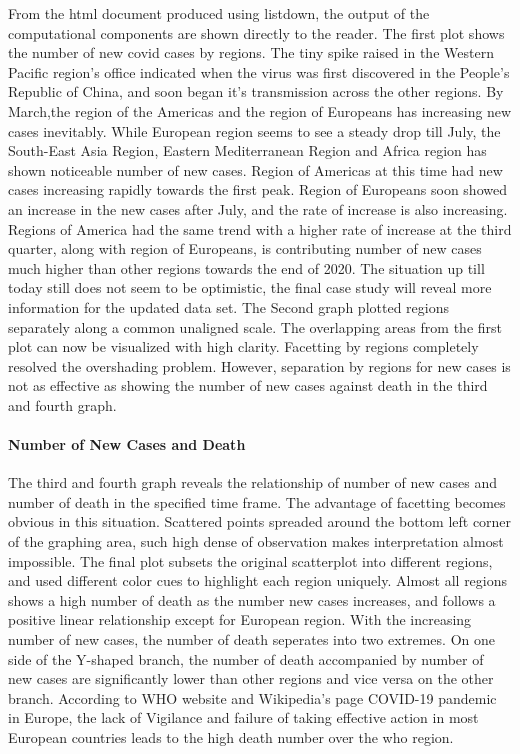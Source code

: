 \documentclass[
]{article}
\begin{document}
From the html document produced using listdown, the output of the
computational components are shown directly to the reader. The first
plot shows the number of new covid cases by regions. The tiny spike
raised in the Western Pacific region's office indicated when the virus
was first discovered in the People's Republic of China, and soon began
it's transmission across the other regions. By March,the region of the
Americas and the region of Europeans has increasing new cases
inevitably. While European region seems to see a steady drop till July,
the South-East Asia Region, Eastern Mediterranean Region and Africa
region has shown noticeable number of new cases. Region of Americas at
this time had new cases increasing rapidly towards the first peak.
Region of Europeans soon showed an increase in the new cases after July,
and the rate of increase is also increasing. Regions of America had the
same trend with a higher rate of increase at the third quarter, along
with region of Europeans, is contributing number of new cases much
higher than other regions towards the end of 2020. The situation up till
today still does not seem to be optimistic, the final case study will
reveal more information for the updated data set. The Second graph
plotted regions separately along a common unaligned scale. The
overlapping areas from the first plot can now be visualized with high
clarity. Facetting by regions completely resolved the overshading
problem. However, separation by regions for new cases is not as
effective as showing the number of new cases against death in the third
and fourth graph.

\hypertarget{number-of-new-cases-and-death}{%
\paragraph{Number of New Cases and
Death}\label{number-of-new-cases-and-death}}

The third and fourth graph reveals the relationship of number of new
cases and number of death in the specified time frame. The advantage of
facetting becomes obvious in this situation. Scattered points spreaded
around the bottom left corner of the graphing area, such high dense of
observation makes interpretation almost impossible. The final plot
subsets the original scatterplot into different regions, and used
different color cues to highlight each region uniquely. Almost all
regions shows a high number of death as the number new cases increases,
and follows a positive linear relationship except for European region.
With the increasing number of new cases, the number of death seperates
into two extremes. On one side of the Y-shaped branch, the number of
death accompanied by number of new cases are significantly lower than
other regions and vice versa on the other branch. According to WHO
website and Wikipedia's page COVID-19 pandemic in Europe, the lack of
Vigilance and failure of taking effective action in most European
countries leads to the high death number over the who region.
\end{document}
